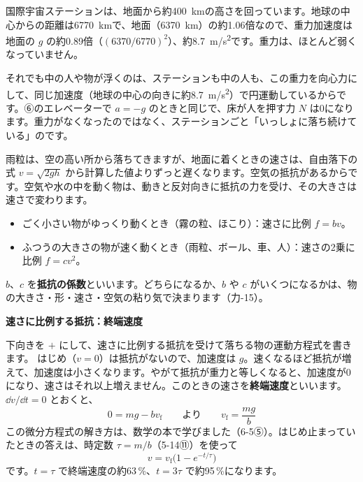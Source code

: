 \begin{motto}[3]
国際宇宙ステーションは、地面から約\qty{400}{km}の高さを回っています。地球の中心からの距離は\qty{6770}{km}で、地面（\qty{6370}{km}）の約1.06倍なので、重力加速度は地面の $g$ の約0.89倍（$(6370/6770)^2$）、約\qty{8.7}{m/s^2}です。重力は、ほとんど弱くなっていません。\par
それでも中の人や物が浮くのは、ステーションも中の人も、この重力を向心力にして、同じ加速度（地球の中心の向きに約\qty{8.7}{m/s^2}）で円運動しているからです。⑥のエレベーターで $a=-g$ のときと同じで、床が人を押す力 $N$ は0になります。重力がなくなったのではなく、ステーションごと「いっしょに落ち続けている」のです。
\end{motto}


\leavevmode\label{ph:力-2:sec8}雨粒は、空の高い所から落ちてきますが、地面に着くときの速さは、自由落下の式 $v=\sqrt{2gh}$ から計算した値よりずっと遅くなります。空気の抵抗があるからです。空気や水の中を動く物は、動きと反対向きに抵抗の力を受け、その大きさは速さで変わります。

\begin{itemize}[leftmargin=1.2\zw, itemsep=2pt, topsep=2pt, label={\color{bkTheme}●}]
\item ごく小さい物がゆっくり動くとき（霧の粒、ほこり）：速さに比例 $f=bv$。
\item ふつうの大きさの物が速く動くとき（雨粒、ボール、車、人）：速さの2乗に比例 $f=cv^2$。
\end{itemize}
$b$、$c$ を\textbf{抵抗の係数}といいます。どちらになるか、$b$ や $c$ がいくつになるかは、物の大きさ・形・速さ・空気の粘り気で決まります（力-15）。

\noindent\textbf{速さに比例する抵抗：終端速度}\par
\noindent\label{ph:力-2:shuutan}下向きを $+$ にして、速さに比例する抵抗を受けて落ちる物の運動方程式を書きます。
はじめ（$v=0$）は抵抗がないので、加速度は $g$。速くなるほど抵抗が増えて、加速度は小さくなります。やがて抵抗が重力と等しくなると、加速度が0になり、速さはそれ以上増えません。このときの速さを\textbf{終端速度}といいます。$\dd v/\dd t=0$ とおくと、
\[ 0=mg-bv_{\mathrm f}\qquad\text{より}\qquad v_{\mathrm f}=\frac{mg}{b} \]
この微分方程式の解き方は、数学の本で学びました（\mbox{6-5⑤}）。はじめ止まっていたときの答えは、時定数 $\tau=m/b$（5-14⑪）を使って
\[ v=v_{\mathrm f}\bigl(1-e^{-t/\tau}\bigr) \]
です。$t=\tau$ で終端速度の約63\,\%、$t=3\tau$ で約95\,\%になります。

